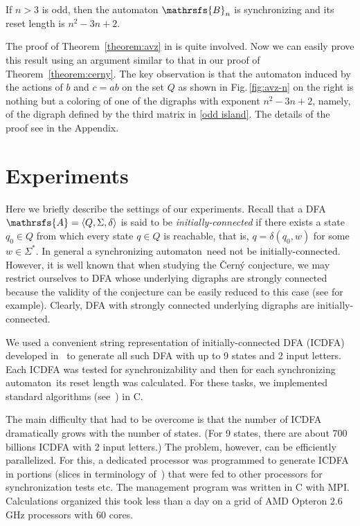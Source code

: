 \documentclass[11pt]{llncs}
\newcommand{\san}{synchronizing automaton}
\begin{document}
\begin{theorem}
\label{theorem:avz}
If $n>3$ is odd, then the automaton $\mathrsfs{B}_n$ is synchronizing and
its reset length is $n^2-3n+2$.
\end{theorem}

The proof of Theorem~\ref{theorem:avz} in \cite{AVZ} is quite involved. Now we can easily
prove this result using an argument similar to that in our proof of Theorem~\ref{theorem:cerny}.
The key observation is that the automaton induced by the actions of $b$ and $c=ab$ on the set $Q$
as shown in Fig.\,\ref{fig:avz-n} on the right is nothing but a coloring of one of the digraphs
with exponent $n^2-3n+2$, namely, of the digraph defined by the third matrix in \eqref{odd island}.
The details of the proof see in the Appendix.

\section{Experiments}
\label{experiments}

Here we briefly describe the settings of our experiments. Recall that a DFA
$\mathrsfs{A}=\langle Q,\Sigma,\delta\rangle$ is said to be \emph{initially-connected}
if there exists a state $q_0\in Q$ from which every state $q\in Q$ is reachable,
that is, $q=\delta(q_0,w)$ for some $w\in\Sigma^*$. In general a \san\ need not
be initially-connected. However, it is well known that when studying the \v{C}ern\'{y}
conjecture, we may restrict ourselves to DFA whose underlying digraphs are strongly
connected because the validity of the conjecture can be easily reduced to this case
(see \cite{Pi78} for example). Clearly, DFA with strongly connected underlying digraphs
are initially-connected.

We used a convenient string representation of initially-connected DFA (ICDFA)
developed in~\cite{AMR} to generate all such DFA with up to 9 states and 2 input
letters. Each ICDFA was tested for synchronizability and then for each \san\
its reset length was calculated. For these tasks, we implemented standard
algorithms (see~\cite{Sa05,Vo08}) in C.

The main difficulty that had to be overcome is that the number of ICDFA dramatically
grows with the number of states. (For 9 states, there are about 700 billions
ICDFA with 2 input letters.) The problem, however, can be efficiently parallelized.
For this, a dedicated processor was programmed to generate ICDFA in portions (slices
in terminology of~\cite{AMR}) that were fed to other processors for synchronization
tests etc. The management program was written in C with MPI. Calculations organized
this took less than a day on a grid of AMD Opteron 2.6 GHz processors with 60 cores.
\end{document}
